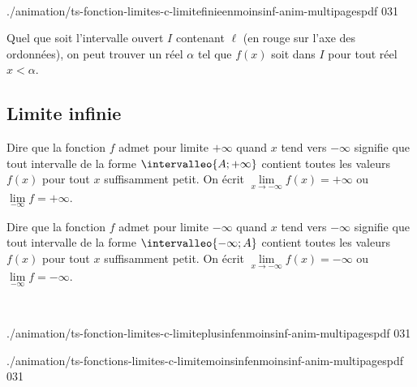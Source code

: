 \begin{intgr}~\newline
\begin{minipage}{0.48\linewidth}
%
	{./animation/ts-fonction-limites-c-limitefinieenmoinsinf-anim-multipagespdf}%
	{0}{31}
\end{minipage} 
\begin{minipage}{0.48\linewidth}
Quel que soit l'intervalle ouvert $I$ contenant $\ell$ (en rouge sur l'axe des ordonnées), on peut trouver un réel $\alpha$ tel que $f(x)$ soit dans $I$ pour tout réel $x<\alpha$.
\end{minipage} 
\end{intgr}

\subsection{Limite infinie}

\begin{dfn}
Dire que la fonction $f$ admet pour limite $+\infty$ quand $x$ tend vers $-\infty$ signifie que tout intervalle de la forme $\intervalleo{A;+\infty}$ contient toutes les valeurs $f(x)$ pour tout $x$ suffisamment petit.\newline
On écrit $\lim\limits_{x\to -\infty} f(x)=+\infty$ ou $\lim\limits_{-\infty} f=+\infty$.
\end{dfn}

\begin{dfn}
Dire que la fonction $f$ admet pour limite $-\infty$ quand $x$ tend vers $-\infty$ signifie que tout intervalle de la forme $\intervalleo{-\infty;A}$ contient toutes les valeurs $f(x)$ pour tout $x$ suffisamment petit.\newline
On écrit $\lim\limits_{x\to -\infty} f(x)=-\infty$ ou $\lim\limits_{-\infty} f=-\infty$.
\end{dfn}

\begin{intgr}~\newline
   \begin{minipage}{0.5\linewidth}%
%
	{./animation/ts-fonction-limites-c-limiteplusinfenmoinsinf-anim-multipagespdf}%
	{0}{31}
   \end{minipage}
	\hfill
	\begin{minipage}{0.5\linewidth}%
%
	{./animation/ts-fonctions-limites-c-limitemoinsinfenmoinsinf-anim-multipagespdf}%
	{0}{31}
   \end{minipage}
\end{intgr}

